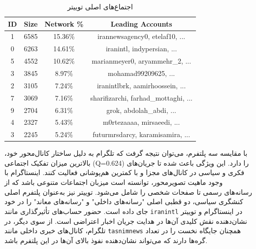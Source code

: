 \documentclass{article}
\begin{document}
	\begin{table}[!htbp]
		\centering
		\caption{اجتماع‌های اصلی توییتر}
		\label{tab:twitter_tab}
		\begin{tabular}{|c|c|c|c|}
			\hline
			\textbf{ID} & \textbf{Size} & \textbf{Network \%} & \textbf{Leading Accounts} \\ \hline
			1 & 6585 & 15.36\% & irannewsagency0, etelaf10, ... \\ \hline
			0 & 6263 & 14.61\% & iranintl, indypersian, ... \\ \hline
			5 & 4552 & 10.62\% & marianmeyer0, aryammehr\_2, ... \\ \hline
			3 & 3845 & 8.97\% & mohamad99209625, ... \\ \hline
			2 & 3105 & 7.24\% & iranintlbrk, aamirhoossein, ... \\ \hline
			7 & 3069 & 7.16\% & sharifizarchi, farhad\_mottaghi, ... \\ \hline
			9 & 2704 & 6.31\% & grok, abdolah\_abdi, ... \\ \hline
			4 & 2327 & 5.43\% & m0rtezaaaa, mirsaeedi, ... \\ \hline
			3 & 2245 & 5.24\% & futurmrsdarcy, karamisamira, ... \\ \hline
		\end{tabular}
	\end{table}
	با مقایسه سه پلتفرم، می‌توان نتیجه گرفت که تلگرام به دلیل ساختار کانال‌محور خود، بالاترین میزان تفکیک اجتماعی (Q=0.624) را دارد. این ویژگی باعث شده تا جریان‌های فکری و سیاسی در کانال‌های مجزا و با کمترین هم‌پوشانی فعالیت کنند. اینستاگرام با وجود ماهیت تصویرمحور، توانسته است میزبان اجتماعات متنوعی باشد که از رسانه‌های رسمی تا صفحات شخصی را شامل می‌شود. توییتر نیز به‌عنوان پلتفرم اصلی کنشگری سیاسی، دو قطبی اصلی "رسانه‌های داخلی" و "رسانه‌های معاند" را در خود جای داده است. حضور حساب‌های تأثیرگذاری مانند \texttt{iranintl} در اینستاگرام و توییتر نشان‌دهنده نقش کلیدی آن‌ها در هدایت جریان اخبار اعتراضی است. از سوی دیگر، در تلگرام، کانال‌های خبری داخلی مانند \texttt{tasnimnews} همچنان جایگاه نخست را در تعداد گره‌ها دارند که می‌تواند نشان‌دهنده نفوذ بالای آن‌ها در این پلتفرم باشد.
\FloatBarrier
\end{document}
